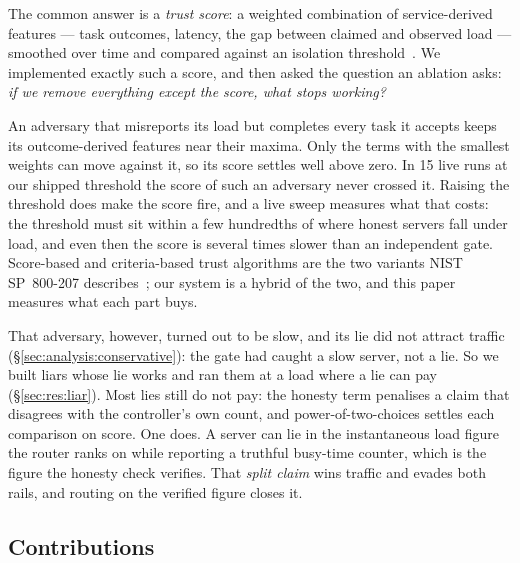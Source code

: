 \documentclass[10pt,twocolumn,letterpaper]{article}
\begin{document}
The common answer is a \emph{trust score}: a weighted combination of
service-derived features --- task outcomes, latency, the gap between claimed
and observed load --- smoothed over time and compared against an isolation
threshold~\cite{huang2024trustmultitier,ali2023ztmec}. We implemented exactly
such a score, and then asked the question an ablation asks: \emph{if we remove
everything except the score, what stops working?}

An adversary that misreports its load but completes every task it accepts
keeps its outcome-derived features near their maxima. Only the terms with the
smallest weights can move against it, so its score settles well above zero. In
15 live runs at our shipped threshold the score of such an adversary never
crossed it. Raising the threshold does make the score fire, and a live sweep
measures what that costs: the threshold must sit within a few hundredths of
where honest servers fall under load, and even then the score is several times
slower than an independent gate. Score-based and criteria-based trust
algorithms are the two variants NIST SP~800-207 describes~\cite{rose2020zta};
our system is a hybrid of the two, and this paper measures what each part
buys.

That adversary, however, turned out to be slow, and its lie did not attract
traffic (\S\ref{sec:analysis:conservative}): the gate had caught a slow
server, not a lie. So we built liars whose lie works and ran them at a load
where a lie can pay (\S\ref{sec:res:liar}). Most lies still do not pay: the
honesty term penalises a claim that disagrees with the controller's own count,
and power-of-two-choices settles each comparison on score. One does. A server
can lie in the instantaneous load figure the router ranks on while reporting a
truthful busy-time counter, which is the figure the honesty check verifies.
That \emph{split claim} wins traffic and evades both rails, and routing on the
verified figure closes it.

\subsection{Contributions}
\end{document}
